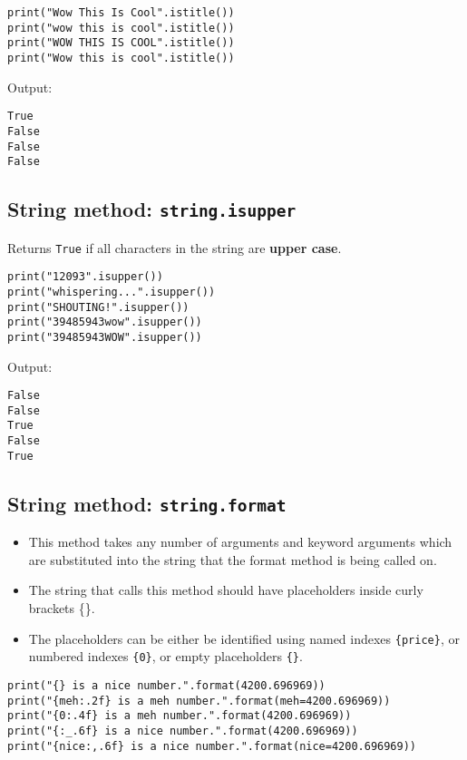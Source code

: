 \documentclass[11pt]{article}
\begin{document}
\begin{verbatim}
print("Wow This Is Cool".istitle())
print("wow this is cool".istitle())
print("WOW THIS IS COOL".istitle())
print("Wow this is cool".istitle())
\end{verbatim}

 \noindent Output:

\label{org94645fb}
\begin{verbatim}
True
False
False
False
\end{verbatim}


 \newpage
\subsection{String method: \texttt{string.isupper}}
\label{sec:orgf100775}
Returns \texttt{True} if all characters in the string are \textbf{upper case}.

\begin{verbatim}
print("12093".isupper())
print("whispering...".isupper())
print("SHOUTING!".isupper())
print("39485943wow".isupper())
print("39485943WOW".isupper())
\end{verbatim}

 \noindent Output:

\label{orge450488}
\begin{verbatim}
False
False
True
False
True
\end{verbatim}


 \newpage
\subsection{String method: \texttt{string.format}}
\label{sec:org945be62}
\begin{itemize}
\item This method takes any number of arguments and keyword arguments which are substituted into the string that the format method is being called on.
\item The string that calls this method should have placeholders inside curly brackets \{\}.
\item The placeholders can be either be identified using named indexes \texttt{\{price\}}, or numbered indexes \texttt{\{0\}}, or empty placeholders \texttt{\{\}}.
\end{itemize}

\begin{verbatim}
print("{} is a nice number.".format(4200.696969))
print("{meh:.2f} is a meh number.".format(meh=4200.696969))
print("{0:.4f} is a meh number.".format(4200.696969))
print("{:_.6f} is a nice number.".format(4200.696969))
print("{nice:,.6f} is a nice number.".format(nice=4200.696969))
\end{verbatim}
\end{document}
